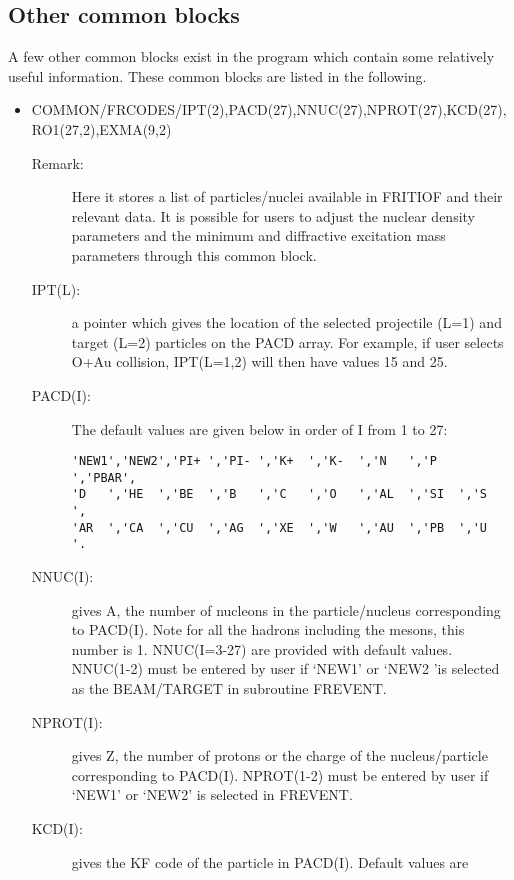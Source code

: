 \subsection{Other common blocks}

A few other common blocks exist in the program which contain some
relatively useful information.  These common blocks are listed in the following.  

\begin{itemize}
\item{COMMON/FRCODES/IPT(2),PACD(27),NNUC(27),NPROT(27),KCD(27),\\
      RO1(27,2),EXMA(9,2)}

\begin{description}
\item[Remark: ] Here it stores a list of particles/nuclei
            available in FRITIOF and their relevant data.  It is possible
            for users to adjust the nuclear density parameters and the
            minimum and diffractive excitation mass parameters through this
            common block.
\item[IPT(L): ] a pointer which gives the location of the selected
                projectile (L=1) and target (L=2) particles on the PACD array.
                For example, if user selects O+Au collision, IPT(L=1,2) will
                then have values 15 and 25.
\item[PACD(I): ] The default values are given below in order of I from 1 to 27:
\begin{verbatim}
'NEW1','NEW2','PI+ ','PI- ','K+  ','K-  ','N   ','P   ','PBAR',
'D   ','HE  ','BE  ','B   ','C   ','O   ','AL  ','SI  ','S   ',
'AR  ','CA  ','CU  ','AG  ','XE  ','W   ','AU  ','PB  ','U   '.
\end{verbatim}
\item[NNUC(I): ] gives A, the number of nucleons in the particle/nucleus
         corresponding to PACD(I).  Note for all the hadrons including
         the mesons, this number is 1.  NNUC(I=3-27) are provided with
         default values.  NNUC(1-2) must be entered by user if `NEW1' or
         `NEW2 'is selected as the BEAM/TARGET in subroutine FREVENT. 
\item[NPROT(I): ] gives Z, the number of protons or the charge of 
         the nucleus/particle corresponding to PACD(I). NPROT(1-2) must
         be entered by user if `NEW1' or `NEW2' is selected in FREVENT.
\item[KCD(I): ] gives the KF code \cite{datag} of the particle in PACD(I). 
         Default values are \\

\end{description}
\end{itemize}
